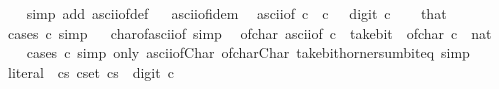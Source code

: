 \begin{isabellebody}
%
\isadelimproof
\ \ %
\endisadelimproof
%
\isatagproof
{}\isamarkupfalse%
\ {\isacharparenleft}{\kern0pt}simp\ add{\isacharcolon}{\kern0pt}\ ascii{\isacharunderscore}{\kern0pt}of{\isacharunderscore}{\kern0pt}def{\isacharparenright}{\kern0pt}\isanewline
\isanewline
{}%
\endisatagproof
{\isafoldproof}%
%
\isadelimproof
%
\endisadelimproof
\ \isamarkupfalse%
\ ascii{\isacharunderscore}{\kern0pt}of{\isacharunderscore}{\kern0pt}idem{\isacharcolon}{\kern0pt}\isanewline
\ \ {\isachardoublequoteopen}ascii{\isacharunderscore}{\kern0pt}of\ c\ {\isacharequal}{\kern0pt}\ c{\isachardoublequoteclose}\ \ {\isachardoublequoteopen}{\isasymnot}\ digit{}\ c{\isachardoublequoteclose}\isanewline
%
\isadelimproof
\ \ %
\endisadelimproof
%
\isatagproof
{}\isamarkupfalse%
\ that\ \isamarkupfalse%
\ {\isacharparenleft}{\kern0pt}cases\ c{\isacharparenright}{\kern0pt}\ simp\isanewline
\isanewline
{}%
\endisatagproof
{\isafoldproof}%
%
\isadelimproof
%
\endisadelimproof
\ \isamarkupfalse%
\ char{\isacharunderscore}{\kern0pt}of{\isacharunderscore}{\kern0pt}ascii{\isacharunderscore}{\kern0pt}of\ {\isacharbrackleft}{\kern0pt}simp{\isacharbrackright}{\kern0pt}{\isacharcolon}{\kern0pt}\isanewline
\ \ {\isachardoublequoteopen}of{\isacharunderscore}{\kern0pt}char\ {\isacharparenleft}{\kern0pt}ascii{\isacharunderscore}{\kern0pt}of\ c{\isacharparenright}{\kern0pt}\ {\isacharequal}{\kern0pt}\ take{\isacharunderscore}{\kern0pt}bit\ {}\ {\isacharparenleft}{\kern0pt}of{\isacharunderscore}{\kern0pt}char\ c\ {\isacharcolon}{\kern0pt}{\isacharcolon}{\kern0pt}\ nat{\isacharparenright}{\kern0pt}{\isachardoublequoteclose}\isanewline
%
\isadelimproof
\ \ %
\endisadelimproof
%
\isatagproof
{}\isamarkupfalse%
\ {\isacharparenleft}{\kern0pt}cases\ c{\isacharparenright}{\kern0pt}\ {\isacharparenleft}{\kern0pt}simp\ only{\isacharcolon}{\kern0pt}\ ascii{\isacharunderscore}{\kern0pt}of{\isacharunderscore}{\kern0pt}Char\ of{\isacharunderscore}{\kern0pt}char{\isacharunderscore}{\kern0pt}Char\ take{\isacharunderscore}{\kern0pt}bit{\isacharunderscore}{\kern0pt}horner{\isacharunderscore}{\kern0pt}sum{\isacharunderscore}{\kern0pt}bit{\isacharunderscore}{\kern0pt}eq{\isacharcomma}{\kern0pt}\ simp{\isacharparenright}{\kern0pt}\isanewline
\isanewline
{}%
\endisatagproof
{\isafoldproof}%
%
\isadelimproof
%
\endisadelimproof
\ \isamarkupfalse%
\ literal\ {\isacharequal}{\kern0pt}\ {\isachardoublequoteopen}{\isacharbraceleft}{\kern0pt}cs{\isachardot}{\kern0pt}\ {\isasymforall}c{\isasymin}set\ cs{\isachardot}{\kern0pt}\ {\isasymnot}\ digit{}\ c{\isacharbraceright}{\kern0pt}{\isachardoublequoteclose}\isanewline

\end{isabellebody}
